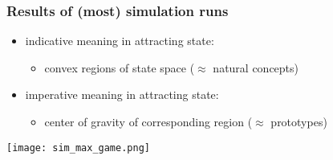 \documentclass[fleqn,9pt,xcolor=dvipsnames]{beamer}
\renewcommand{\markdef}[1]{{\color{mycol}{#1}}}
\newcommand{\mygray}[1]{{\color{gray}{#1}}}
\newcommand{\slideFN}[1]{%
  \begin{textblock*}{\paperwidth}(0pt,1.05\textheight)
    \hfill \footnotesize{\mygray{#1}} \hspace{.5em}
  \end{textblock*}}
\begin{document}


    




\begin{frame}
  \frametitle{Results of (most) simulation runs}
    \begin{itemize}
    \item indicative meaning in attracting state:
      \begin{itemize}
      \item convex regions of state space \hfill ($\approx$ natural concepts)
      \end{itemize}
    \item imperative meaning in attracting state:
      \begin{itemize}
      \item center of gravity of corresponding region \hfill ($\approx$ prototypes)
      \end{itemize}
    \end{itemize}
    \begin{center}
      \texttt{[image: sim\_max\_game.png]}
    \end{center}

\end{frame}
\end{document}
